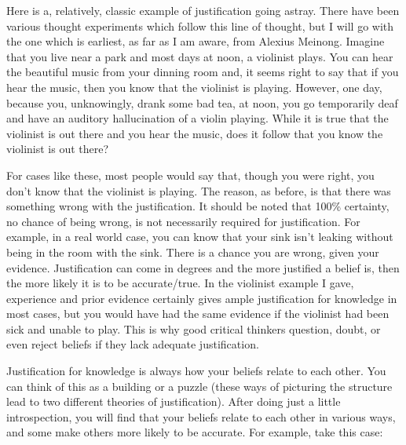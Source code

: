 Here is a, relatively, classic example of justification going astray. There have been various thought experiments which follow this line of thought, but I will go with the one which is earliest, as far as I am aware, from Alexius Meinong. Imagine that you live near a park and most days at noon, a violinist plays. You can hear the beautiful music from your dinning room and, it seems right to say that if you hear the music, then you know that the violinist is playing. However, one day, because you, unknowingly, drank some bad tea, at noon, you go temporarily deaf and have an auditory hallucination of a violin playing. While it is true that the violinist is out there and you hear the music, does it follow that you know the violinist is out there? 

For cases like these, most people would say that, though you were right, you don't know that the violinist is playing. The reason, as before, is that there was something wrong with the justification. It should be noted that 100\% certainty, no chance of being wrong, is not necessarily required for justification. For example, in a real world case, you can know that your sink isn't leaking without being in the room with the sink. There is a chance you are wrong, given your evidence. Justification can come in degrees and the more justified a belief is, then the more likely it is to be accurate/true. In the violinist example I gave, experience and prior evidence certainly gives ample justification for knowledge in most cases, but you would have had the same evidence if the violinist had been sick and unable to play. This is why good critical thinkers question, doubt, or even reject beliefs if they lack adequate justification.

Justification for knowledge is always how your beliefs relate to each other. You can think of this as a building or a puzzle (these ways of picturing the structure lead to two different theories of justification). After doing just a little introspection, you will find that your beliefs relate to each other in various ways, and some make others more likely to be accurate. For example, take this case:


